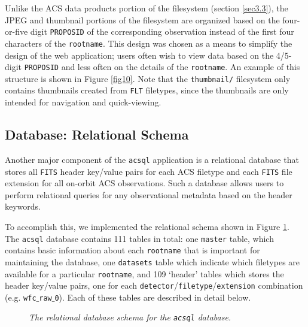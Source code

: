 \documentclass[10pt,journal,compsoc]{IEEEtran}
\begin{document}
Unlike the ACS data products portion of the filesystem (section \ref{sec3.3}), the JPEG and thumbnail portions of the filesystem are organized based on the
four-or-five digit \texttt{PROPOSID} of the corresponding observation instead of the first four characters of the \texttt{rootname}.  This design was chosen as a means to simplify the
design of the web application; users often wish to view data based on the 4/5-digit \texttt{PROPOSID} and less often on the details of the \texttt{rootname}.  An example of this
structure is shown in Figure \ref{fig10}.  Note that the \texttt{thumbnail/} filesystem only contains thumbnails created from \texttt{FLT} filetypes, since the thumbnails are only
intended for navigation and quick-viewing.


\subsection{Database: Relational Schema} \label{sec3.5}

Another major component of the \texttt{acsql} application is a relational database that stores all \texttt{FITS} header key/value pairs for each ACS filetype and each \texttt{FITS} file
extension for all on-orbit ACS observations.  Such a database allows users to perform relational queries for any observational metadata based on the header keywords.

To accomplish this, we implemented the relational schema shown in Figure \ref{fig11}.  The \texttt{acsql} database contains 111 tables in total: one \texttt{master} table, which contains
basic information about each \texttt{rootname} that is important for maintaining the database, one \texttt{datasets} table which indicate which filetypes are available for a
particular \texttt{rootname}, and 109 `header' tables which stores the header key/value pairs, one for each \texttt{detector}/\texttt{filetype}/\texttt{extension} combination (e.g.
\texttt{wfc$\_$raw$\_$0}).  Each of these tables are described in detail below.

\begin{figure}[!t]
\centering
{}
\caption{\textit{The relational database schema for the \texttt{acsql} database.}
\label{fig11}}
\end{figure}
\end{document}
